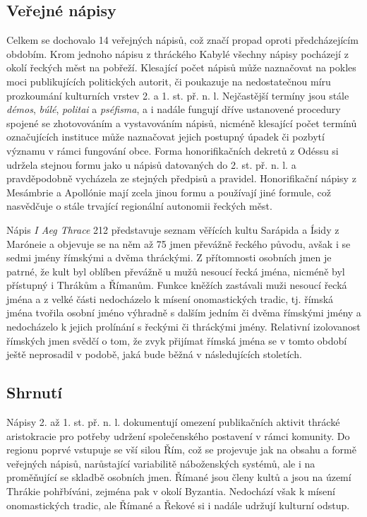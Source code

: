 \subsection[veřejné-nápisy-8]{Veřejné nápisy}

Celkem se dochovalo 14 veřejných nápisů, což značí propad oproti předcházejícím obdobím. Krom jednoho nápisu z thráckého Kabylé všechny nápisy pocházejí z okolí řeckých měst na pobřeží. Klesající počet nápisů může naznačovat na pokles moci publikujících politických autorit, či poukazuje na nedostatečnou míru prozkoumání kulturních vrstev 2. a 1. st. př. n. l. Nejčastější termíny jsou stále {\em démos}, {\em búlé}, {\em politai} a {\em pséfisma}, a i nadále fungují dříve ustanovené procedury spojené se zhotovováním a vystavováním nápisů, nicméně klesající počet termínů označujících instituce může naznačovat jejich postupný úpadek či pozbytí významu v rámci fungování obce. Forma honorifikačních dekretů z Odéssu si udržela stejnou formu jako u nápisů datovaných do 2. st. př. n. l. a pravděpodobně vycházela ze stejných předpisů a pravidel. Honorifikační nápisy z Mesámbrie a Apollónie mají zcela jinou formu a používají jiné formule, což nasvědčuje o stále trvající regionální autonomii řeckých měst.

Nápis {\em I Aeg Thrace} 212 představuje seznam věřících kultu Sarápida a Ísidy z Maróneie a objevuje se na něm až 75 jmen převážně řeckého původu, avšak i se sedmi jmény římskými a dvěma thráckými. Z přítomnosti osobních jmen je patrné, že kult byl oblíben převážně u mužů nesoucí řecká jména, nicméně byl přístupný i Thrákům a Římanům. Funkce kněžích zastávali muži nesoucí řecká jména a z velké části nedocházelo k mísení onomastických tradic, tj. římská jména tvořila osobní jméno výhradně s dalším jedním či dvěma římskými jmény a nedocházelo k jejich prolínání s řeckými či thráckými jmény. Relativní izolovanost římských jmen svědčí o tom, že zvyk přijímat římská jména se v tomto období ještě neprosadil v podobě, jaká bude běžná v následujících stoletích.

\subsection[shrnutí-12]{Shrnutí}

Nápisy 2. až 1. st. př. n. l. dokumentují omezení publikačních aktivit thrácké aristokracie pro potřeby udržení společenského postavení v rámci komunity. Do regionu poprvé vstupuje se vší silou Řím, což se projevuje jak na obsahu a formě veřejných nápisů, narůstající variabilitě náboženských systémů, ale i na proměňující se skladbě osobních jmen. Římané jsou členy kultů a jsou na území Thrákie pohřbíváni, zejména pak v okolí Byzantia. Nedochází však k mísení onomastických tradic, ale Římané a Řekové si i nadále udržují kulturní odstup.

